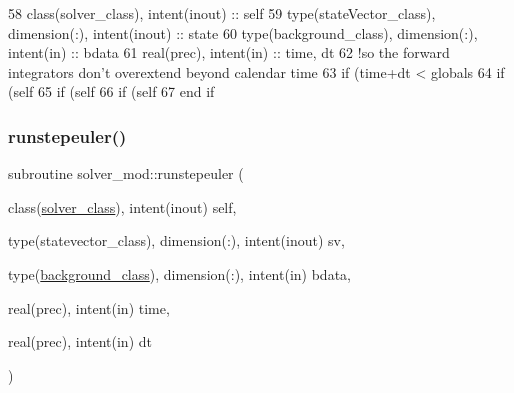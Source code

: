 \begin{DoxyCode}
58     \textcolor{keywordtype}{class}(solver\_class), \textcolor{keywordtype}{intent(inout)} :: self
59     \textcolor{keywordtype}{type}(stateVector\_class), \textcolor{keywordtype}{dimension(:)}, \textcolor{keywordtype}{intent(inout)} :: state
60     \textcolor{keywordtype}{type}(background\_class), \textcolor{keywordtype}{dimension(:)}, \textcolor{keywordtype}{intent(in)} :: bdata
61     \textcolor{keywordtype}{real(prec)}, \textcolor{keywordtype}{intent(in)} :: time, dt
62     \textcolor{comment}{!so the forward integrators don't overextend beyond calendar time}
63     \textcolor{keywordflow}{if} (time+dt < globals%
64         \textcolor{keywordflow}{if} (self%
65         \textcolor{keywordflow}{if} (self%
66         \textcolor{keywordflow}{if} (self%
67 \textcolor{keywordflow}{    end if}
\end{DoxyCode}
\mbox{\label{namespacesolver__mod_a21533e195501ebb46c1814aeaede4c55}} 
\subsubsection{\texorpdfstring{runstepeuler()}{runstepeuler()}}
{\footnotesize\ttfamily subroutine solver\+\_\+mod\+::runstepeuler (\begin{DoxyParamCaption}\item[{class(\mbox{\hyperlink{structsolver__mod_1_1solver__class}{solver\+\_\+class}}), intent(inout)}]{self,  }\item[{type(statevector\+\_\+class), dimension(\+:), intent(inout)}]{sv,  }\item[{type(\mbox{\hyperlink{structbackground__mod_1_1background__class}{background\+\_\+class}}), dimension(\+:), intent(in)}]{bdata,  }\item[{real(prec), intent(in)}]{time,  }\item[{real(prec), intent(in)}]{dt }\end{DoxyParamCaption})\hspace{0.3cm}{\ttfamily [private]}}



